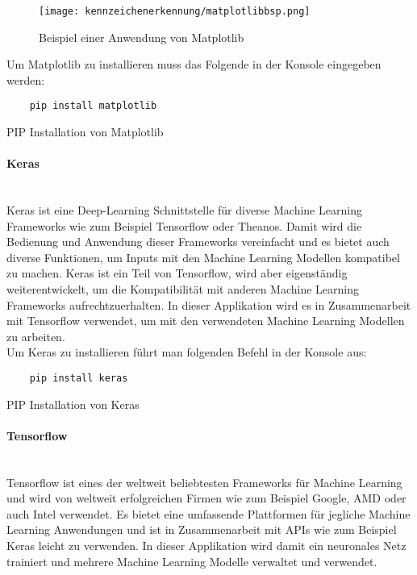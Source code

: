\begin{figure}[H]
    \centering
    \texttt{[image: kennzeichenerkennung/matplotlibbsp.png]}
    \caption{Beispiel einer Anwendung von Matplotlib}
\end{figure}

Um Matplotlib zu installieren muss das Folgende in der Konsole eingegeben werden:

\begin{listing}[H]
    \begin{verbatim}
    pip install matplotlib
    \end{verbatim}
    \caption{PIP Installation von Matplotlib}
\end{listing}

\paragraph{Keras}\mbox{}\\
Keras ist eine Deep-Learning Schnittstelle für diverse Machine Learning Frameworks wie zum Beispiel Tensorflow oder Theanos. 
Damit wird die Bedienung und Anwendung dieser Frameworks vereinfacht und es bietet auch diverse Funktionen, um Inputs mit 
den Machine Learning Modellen kompatibel zu machen. Keras ist ein Teil von Tensorflow, wird aber eigenständig weiterentwickelt, 
um die Kompatibilität mit anderen Machine Learning Frameworks aufrechtzuerhalten. In dieser Applikation wird es in 
Zusammenarbeit mit Tensorflow verwendet, um mit den verwendeten Machine Learning Modellen zu arbeiten.\\

Um Keras zu installieren führt man folgenden Befehl in der Konsole aus:

\begin{listing}[H]
    \begin{verbatim}
    pip install keras
    \end{verbatim}
    \caption{PIP Installation von Keras}
\end{listing}

\paragraph{Tensorflow}\mbox{}\\
Tensorflow ist eines der weltweit beliebtesten Frameworks für Machine Learning und wird von weltweit erfolgreichen Firmen wie 
zum Beispiel Google, AMD oder auch Intel verwendet. Es bietet eine umfassende Plattformen für jegliche Machine Learning Anwendungen 
und ist in Zusammenarbeit mit APIs wie zum Beispiel Keras leicht zu verwenden. In dieser Applikation wird damit ein neuronales 
Netz trainiert und mehrere Machine Learning Modelle verwaltet und verwendet.\\


